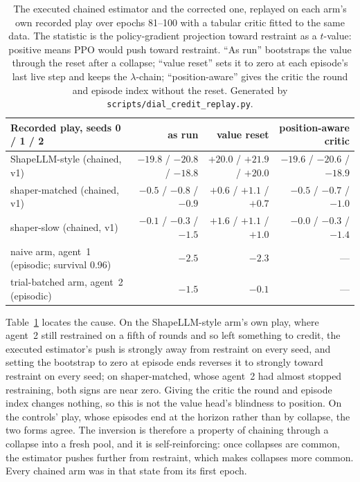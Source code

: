 \begin{table}[ht]
\centering\small
\caption{The executed chained estimator and the corrected one, replayed on
  each arm's own recorded play over epochs 81--100 with a tabular critic
  fitted to the same data.
  The statistic is the policy-gradient projection toward restraint as a
  \(t\)-value: positive means PPO would push toward restraint.
  ``As run'' bootstraps the value through the reset after a collapse;
  ``value reset'' sets it to zero at each episode's last live step and
  keeps the \(\lambda\)-chain; ``position-aware'' gives the critic the
  round and episode index without the reset.
  Generated by \texttt{scripts/dial\_credit\_replay.py}.}
\label{tab:v1-replay}
\begin{tabular}{lrrr}
\toprule
Recorded play, seeds 0 / 1 / 2 & as run & value reset & position-aware critic \\
\midrule
ShapeLLM-style (chained, v1) & \(-19.8\) / \(-20.8\) / \(-18.8\) & \(+20.0\) / \(+21.9\) / \(+20.0\) & \(-19.6\) / \(-20.6\) / \(-18.9\) \\
shaper-matched (chained, v1) & \(-0.5\) / \(-0.8\) / \(-0.9\) & \(+0.6\) / \(+1.1\) / \(+0.7\) & \(-0.5\) / \(-0.7\) / \(-1.0\) \\
shaper-slow (chained, v1) & \(-0.1\) / \(-0.3\) / \(-1.5\) & \(+1.6\) / \(+1.1\) / \(+1.0\) & \(-0.0\) / \(-0.3\) / \(-1.4\) \\
naive arm, agent~1 (episodic; survival 0.96) & \(-2.5\) & \(-2.3\) & --- \\
trial-batched arm, agent~2 (episodic) & \(-1.5\) & \(-0.1\) & --- \\
\bottomrule
\end{tabular}
\end{table}

Table~\ref{tab:v1-replay} locates the cause.
On the ShapeLLM-style arm's own play, where agent~2 still restrained on a
fifth of rounds and so left something to credit, the executed estimator's
push is strongly away from restraint on every seed, and setting the
bootstrap to zero at episode ends reverses it to strongly toward restraint
on every seed; on shaper-matched, whose agent~2 had almost stopped
restraining, both signs are near zero.
Giving the critic the round and episode index changes nothing, so this is
not the value head's blindness to position.
On the controls' play, whose episodes end at the horizon rather than by
collapse, the two forms agree.
The inversion is therefore a property of chaining through a collapse into
a fresh pool, and it is self-reinforcing: once collapses are common, the
estimator pushes further from restraint, which makes collapses more
common.
Every chained arm was in that state from its first epoch.

